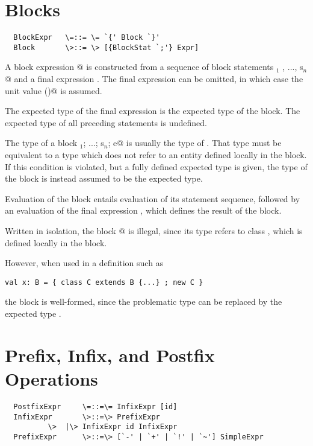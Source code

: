 \documentclass[11pt]{report}
\begin{document}
\section{Blocks}
\label{sec:blocks}

\syntax\begin{verbatim}
  BlockExpr   \=::= \= `{' Block `}'
  Block       \>::= \> [{BlockStat `;'} Expr]
\end{verbatim}

A block expression @ is constructed from a
sequence of block statements \verb@s$_1$ , ..., s$_n$@ and a final
expression \verb@e@. The final expression can be omitted, in which
case the unit value \verb@()@ is assumed.


The expected type of the final expression \verb@e@ is the expected
type of the block. The expected type of all preceding statements is
undefined.

The type of a block \verb@s$_1$; ...; s$_n$; e@ is usually the type of
\verb@e@.  That type must be equivalent to a type which does not refer
to an entity defined locally in the block. If this condition is
violated, but a fully defined expected type is given, the type of the
block is instead assumed to be the expected type.

Evaluation of the block entails evaluation of its statement sequence,
followed by an evaluation of the final expression \verb@e@, which
defines the result of the block.

\example
Written in isolation, 
the block @ is illegal, since its type
refers to class \verb@C@, which is defined locally in the block.

However, when used in a definition such as 
\begin{verbatim}
val x: B = { class C extends B {...} ; new C }
\end{verbatim}
the block is well-formed, since the problematic type \verb@C@ can be
replaced by the expected type \verb@B@.

\section{Prefix, Infix, and Postfix Operations}
\label{sec:infix-operations}

\syntax\begin{verbatim}
  PostfixExpr     \=::=\= InfixExpr [id]
  InfixExpr       \>::=\> PrefixExpr
		  \>  |\> InfixExpr id InfixExpr
  PrefixExpr      \>::=\> [`-' | `+' | `!' | `~'] SimpleExpr 
\end{verbatim}
\end{document}
